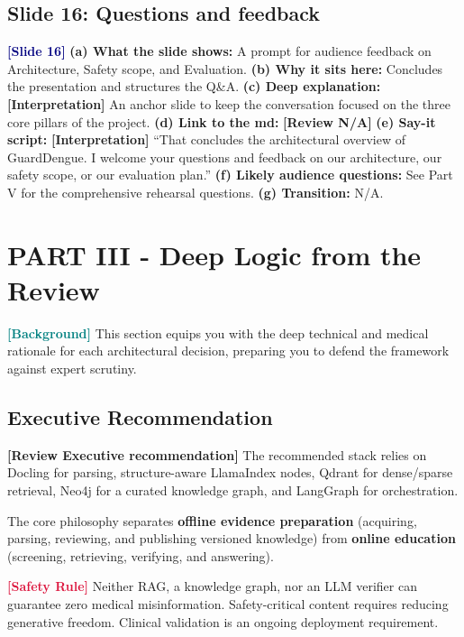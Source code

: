\documentclass[11pt,a4paper]{article}
\newcommand{\origintag}[2]{\textcolor{#1}{\small\textbf{[#2]}}}
\begin{document}
\subsection{Slide 16: Questions and feedback}
\origintag{navy}{Slide 16}
\textbf{(a) What the slide shows:} A prompt for audience feedback on Architecture, Safety scope, and Evaluation.
\textbf{(b) Why it sits here:} Concludes the presentation and structures the Q\&A.
\textbf{(c) Deep explanation:} \origintag{slate}{Interpretation} An anchor slide to keep the conversation focused on the three core pillars of the project.
\textbf{(d) Link to the md:} \origintag{amber}{Review N/A}
\textbf{(e) Say-it script:} \origintag{slate}{Interpretation} ``That concludes the architectural overview of GuardDengue. I welcome your questions and feedback on our architecture, our safety scope, or our evaluation plan.''
\textbf{(f) Likely audience questions:} See Part V for the comprehensive rehearsal questions.
\textbf{(g) Transition:} N/A.

\newpage
\section{PART III - Deep Logic from the Review}

\origintag{teal}{Background} This section equips you with the deep technical and medical rationale for each architectural decision, preparing you to defend the framework against expert scrutiny.

\subsection{Executive Recommendation}
\origintag{amber}{Review Executive recommendation}
The recommended stack relies on Docling for parsing, structure-aware LlamaIndex nodes, Qdrant for dense/sparse retrieval, Neo4j for a curated knowledge graph, and LangGraph for orchestration. 

The core philosophy separates \textbf{offline evidence preparation} (acquiring, parsing, reviewing, and publishing versioned knowledge) from \textbf{online education} (screening, retrieving, verifying, and answering). 

\begin{warning}
\origintag{crimson}{Safety Rule} Neither RAG, a knowledge graph, nor an LLM verifier can guarantee zero medical misinformation. Safety-critical content requires reducing generative freedom. Clinical validation is an ongoing deployment requirement.
\end{warning}
\end{document}
